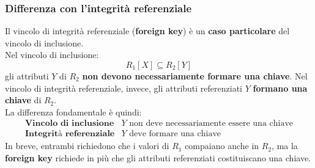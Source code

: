 \subsubsection{Differenza con l'integrità referenziale}
Il vincolo di integrità referenziale (\textbf{foreign key}) è un
\textbf{caso particolare} del vincolo di inclusione.\\
Nel vincolo di inclusione:
\[
R_1[X] \subseteq R_2[Y]
\]
gli attributi $Y$ di $R_2$ \textbf{non devono necessariamente formare
una chiave}.
Nel vincolo di integrità referenziale, invece, gli attributi
referenziati $Y$ \textbf{formano una chiave} di $R_2$.\\
La differenza fondamentale è quindi:
\[
\boxed{
\begin{array}{c|c}
\textbf{Vincolo di inclusione} &
Y \text{ non deve necessariamente essere una chiave}
\\[2mm]
\textbf{Integrità referenziale} &
Y \text{ deve formare una chiave}
\end{array}
}
\]
In breve, entrambi richiedono che i valori di $R_1$ compaiano anche
in $R_2$, ma la \textbf{foreign key} richiede in più che gli attributi
referenziati costituiscano una chiave.
